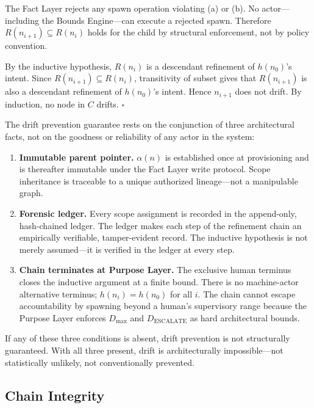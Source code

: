 The Fact Layer rejects any spawn operation violating (a) or (b). No actor---including the Bounds Engine---can execute a rejected spawn. Therefore $R(n_{i+1}) \subseteq R(n_i)$ holds for the child by structural enforcement, not by policy convention.

By the inductive hypothesis, $R(n_i)$ is a descendant refinement of $h(n_0)$'s intent. Since $R(n_{i+1}) \subseteq R(n_i)$, transitivity of subset gives that $R(n_{i+1})$ is also a descendant refinement of $h(n_0)$'s intent. Hence $n_{i+1}$ does not drift. By induction, no node in $C$ drifts. $\square$

\medskip
The drift prevention guarantee rests on the conjunction of three architectural facts, not on the goodness or reliability of any actor in the system:

\begin{enumerate}
    \item[(1)] \textbf{Immutable parent pointer.} $\alpha(n)$ is established once at provisioning and is thereafter immutable under the Fact Layer write protocol. Scope inheritance is traceable to a unique authorized lineage---not a manipulable graph.
    \item[(2)] \textbf{Forensic ledger.} Every scope assignment is recorded in the append-only, hash-chained ledger. The ledger makes each step of the refinement chain an empirically verifiable, tamper-evident record. The inductive hypothesis is not merely assumed---it is verified in the ledger at every step.
    \item[(3)] \textbf{Chain terminates at Purpose Layer.} The exclusive human terminus closes the inductive argument at a finite bound. There is no machine-actor alternative terminus; $h(n_i) = h(n_0)$ for all $i$. The chain cannot escape accountability by spawning beyond a human's supervisory range because the Purpose Layer enforces $D_{\mathrm{max}}$ and $D_{\mathrm{ESCALATE}}$ as hard architectural bounds.
\end{enumerate}

If any of these three conditions is absent, drift prevention is not structurally guaranteed. With all three present, drift is architecturally impossible---not statistically unlikely, not conventionally prevented.

\subsection{Chain Integrity}
\label{sec:rs-chain-integrity}

